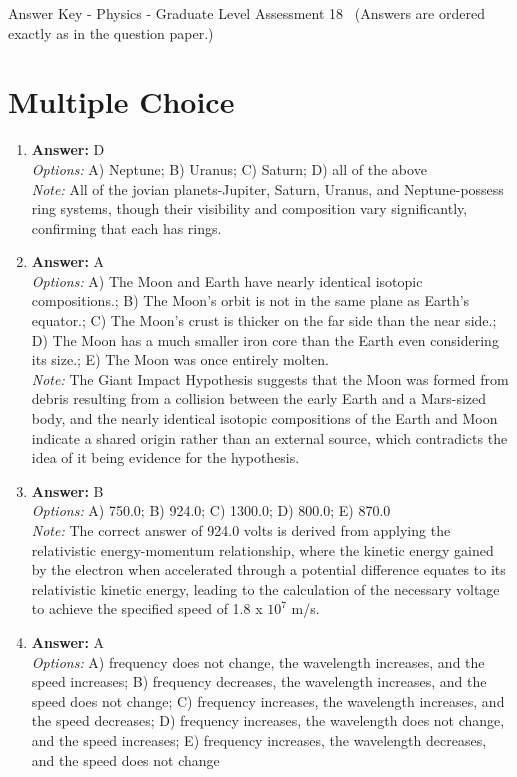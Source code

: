 \documentclass[12pt]{article}
\begin{document}
\begin{center}
Answer Key - Physics - Graduate Level Assessment 18 \
\small (Answers are ordered exactly as in the question paper.)
\end{center}

\section*{Multiple Choice}
\begin{enumerate}[label=\arabic*.]
\item \textbf{Answer:} D
\\ \textit{Options:} A) Neptune; B) Uranus; C) Saturn; D) all of the above
\\ \textit{Note:} All of the jovian planets-Jupiter, Saturn, Uranus, and Neptune-possess ring systems, though their visibility and composition vary significantly, confirming that each has rings.
\item \textbf{Answer:} A
\\ \textit{Options:} A) The Moon and Earth have nearly identical isotopic compositions.; B) The Moon's orbit is not in the same plane as Earth's equator.; C) The Moon's crust is thicker on the far side than the near side.; D) The Moon has a much smaller iron core than the Earth even considering its size.; E) The Moon was once entirely molten.
\\ \textit{Note:} The Giant Impact Hypothesis suggests that the Moon was formed from debris resulting from a collision between the early Earth and a Mars-sized body, and the nearly identical isotopic compositions of the Earth and Moon indicate a shared origin rather than an external source, which contradicts the idea of it being evidence for the hypothesis.
\item \textbf{Answer:} B
\\ \textit{Options:} A) 750.0; B) 924.0; C) 1300.0; D) 800.0; E) 870.0
\\ \textit{Note:} The correct answer of 924.0 volts is derived from applying the relativistic energy-momentum relationship, where the kinetic energy gained by the electron when accelerated through a potential difference equates to its relativistic kinetic energy, leading to the calculation of the necessary voltage to achieve the specified speed of 1.8 x $10^7$ m/s.
\item \textbf{Answer:} A
\\ \textit{Options:} A) frequency does not change, the wavelength increases, and the speed increases; B) frequency decreases, the wavelength increases, and the speed does not change; C) frequency increases, the wavelength increases, and the speed decreases; D) frequency increases, the wavelength does not change, and the speed increases; E) frequency increases, the wavelength decreases, and the speed does not change

\end{enumerate}
\end{document}

